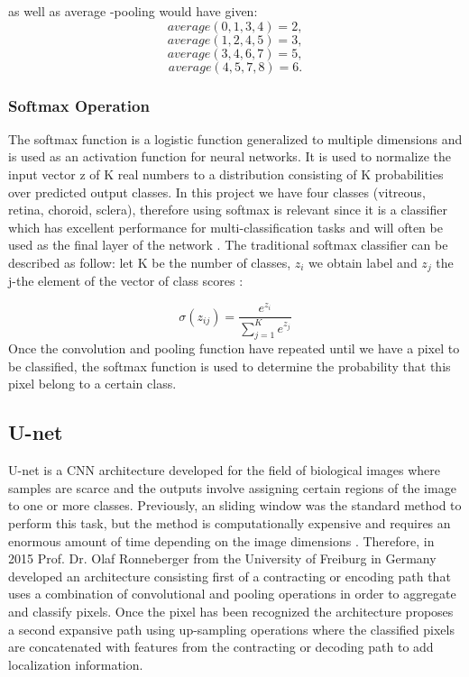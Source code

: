 \documentclass[12pt,a4paper]{scrartcl}
\begin{document}
as well as average -pooling would have given:
\[average (0, 1, 3, 4) = 2,\]
\[average (1, 2, 4, 5) = 3,\]
\[average (3, 4, 6, 7) = 5,\]
\[average (4, 5, 7, 8) = 6.\]

\subsubsection{Softmax Operation}\label{tech:softmax}
The softmax function is a logistic function generalized to multiple dimensions and is used as an activation function for neural networks. It is used to normalize the input vector z of K real numbers to a distribution consisting of K probabilities over predicted output classes. In this project we have four classes (vitreous, retina, choroid, sclera), therefore using softmax is relevant since it is a classifier which has excellent performance for multi-classification tasks and will often be used as the final layer of the network \cite{SoftMaxClassification}. 
The traditional softmax classifier can be described as follow: let  K be the number of classes, \(z_i\) we obtain  label and \(z_j\) the j-the element of the vector of class scores \cite{SoftMaxClassification, DIDLBook} :

\begin{equation}
\sigma(z_{ij}) = \frac{e^{z_i}}{\sum_{j=1}^{K} e^{z_j}}
\end{equation}
Once the convolution and pooling function have repeated until we have a pixel to be classified, the softmax function is used to determine the probability that this pixel belong to a certain class.

\subsection{U-net}\label{tech:unet}

U-net is a CNN architecture developed for the field of biological images where samples are scarce and the outputs involve assigning certain regions of the image to one or more classes. Previously, an sliding window was the standard method to perform this task, but the method is computationally expensive and requires an enormous amount of time depending on the image dimensions \cite{Ronneberger2015}. Therefore, in 2015 Prof. Dr. Olaf Ronneberger from the University of Freiburg in Germany developed an architecture consisting first of a contracting or encoding path that uses a combination of convolutional and pooling operations in order to aggregate and classify pixels. Once the pixel has been recognized the architecture proposes a second expansive path using up-sampling operations where the classified pixels are concatenated with features from the contracting or decoding path to add localization information. 
\end{document}
